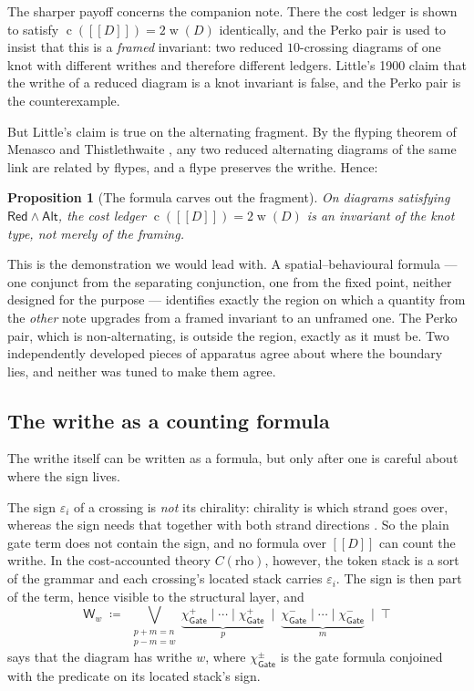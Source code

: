 \documentclass[11pt]{article}
\newtheorem{proposition}{Proposition}
\theoremstyle{definition}
\newcommand{\enc}[1]{[\![ #1 ]\!]}
\newcommand{\writhe}{\operatorname{w}}
\newcommand{\cost}{\operatorname{c}}
\newcommand{\Gate}{\mathsf{Gate}}
\newcommand{\charf}[1]{\chi_{#1}}
\newcommand{\sep}{\mathbin{\vert}}
\begin{document}
The sharper payoff concerns the companion note. There the cost ledger is shown to
satisfy $\cost(\enc{D}) = 2\writhe(D)$ identically, and the Perko pair is used to
insist that this is a \emph{framed} invariant: two reduced $10$-crossing diagrams
of one knot with different writhes and therefore different ledgers. Little's 1900
claim that the writhe of a reduced diagram is a knot invariant is false, and the
Perko pair is the counterexample.

But Little's claim is true on the alternating fragment. By the flyping theorem of
Menasco and Thistlethwaite \cite{flyping}, any two reduced alternating diagrams of
the same link are related by flypes, and a flype preserves the writhe. Hence:

\begin{proposition}[The formula carves out the fragment]\label{prop:fragment}
On diagrams satisfying $\mathsf{Red} \wedge \mathsf{Alt}$, the cost ledger
$\cost(\enc{D}) = 2\writhe(D)$ is an invariant of the knot type, not merely of the
framing.
\end{proposition}

This is the demonstration we would lead with. A spatial--behavioural formula ---
one conjunct from the separating conjunction, one from the fixed point, neither
designed for the purpose --- identifies exactly the region on which a quantity
from the \emph{other} note upgrades from a framed invariant to an unframed one.
The Perko pair, which is non-alternating, is outside the region, exactly as it
must be. Two independently developed pieces of apparatus agree about where the
boundary lies, and neither was tuned to make them agree.

\subsection{The writhe as a counting formula}\label{sec:writhe}

The writhe itself can be written as a formula, but only after one is careful about
where the sign lives.

The sign $\varepsilon_i$ of a crossing is \emph{not} its chirality: chirality is
which strand goes over, whereas the sign needs that together with both strand
directions \cite[Rem.~2]{knots}. So the plain gate term does not contain the sign,
and no formula over $\enc{D}$ can count the writhe. In the cost-accounted theory
$C(\mathrm{rho})$, however, the token stack is a sort of the grammar
\cite[\S6]{omnibus} and each crossing's located stack carries $\varepsilon_i$.
The sign is then part of the term, hence visible to the structural layer, and
\[
\mathsf{W}_{w} \;\coloneqq\;
\bigvee_{\substack{p+m = n \\ p - m = w}}
\underbrace{\charf{\Gate}^{+} \sep \cdots \sep \charf{\Gate}^{+}}_{p}
\ \sep\
\underbrace{\charf{\Gate}^{-} \sep \cdots \sep \charf{\Gate}^{-}}_{m}
\ \sep\ \top
\]
says that the diagram has writhe $w$, where $\charf{\Gate}^{\pm}$ is the gate
formula conjoined with the predicate on its located stack's sign.
\end{document}
